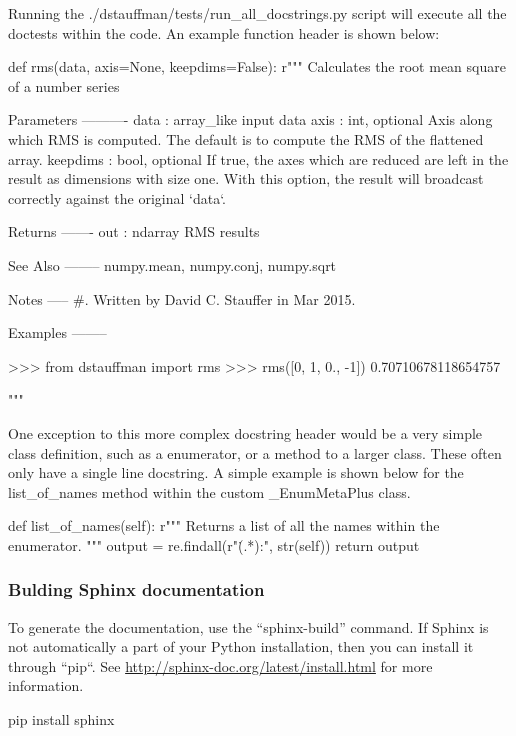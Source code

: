 \documentclass[12pt]{article}
\begin{document}
Running the ./dstauffman/tests/run\_all\_docstrings.py script will execute all the doctests within the code.  An example function header is shown below:

\begin{Python}
def rms(data, axis=None, keepdims=False):
    r"""
    Calculates the root mean square of a number series

    Parameters
    ----------
    data : array_like
        input data
    axis : int, optional
        Axis along which RMS is computed. The default is to compute the RMS of the flattened array.
    keepdims : bool, optional
        If true, the axes which are reduced are left in the result as dimensions with size one.
        With this option, the result will broadcast correctly against the original `data`.

    Returns
    -------
    out : ndarray
        RMS results

    See Also
    --------
    numpy.mean, numpy.conj, numpy.sqrt

    Notes
    -----
    #.  Written by David C. Stauffer in Mar 2015.

    Examples
    --------

    >>> from dstauffman import rms
    >>> rms([0, 1, 0., -1])
    0.70710678118654757

    """
\end{Python}

One exception to this more complex docstring header would be a very simple class definition, such as a enumerator, or a method to a larger class.  These often only have a single line docstring.  A simple example is shown below for the list\_of\_names method within the custom \_EnumMetaPlus class.

\begin{Python}
    def list_of_names(self):
        r"""
        Returns a list of all the names within the enumerator.
        """
        output = re.findall(r"\.(.*):", str(self))
        return output
\end{Python}

\subsubsection{Bulding Sphinx documentation}
To generate the documentation, use the ``sphinx-build'' command.  If Sphinx is not automatically a part of your Python installation, then you can install it through ``pip``. See \url{http://sphinx-doc.org/latest/install.html} for more information.
\begin{PlainText}
pip install sphinx
\end{PlainText}
\end{document}
